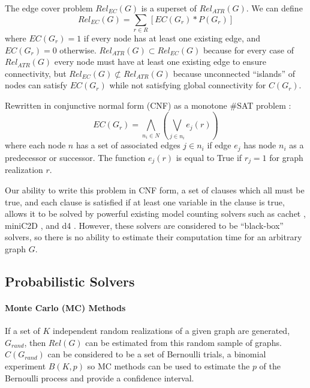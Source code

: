 \documentclass[12pt,twocolumn]{article}
\begin{document}
The edge cover problem \(Rel_{EC}(G)\) is a superset of \(Rel_{ATR}(G)\). We can define \[Rel_{EC}(G) = \sum_{r \in R} [EC(G_r)*P(G_r)]\] where \(EC(G_r)=1\) if every node has at least one existing edge, and \(EC(G_r)=0\) otherwise. \(Rel_{ATR}(G) \subset Rel_{EC}(G)\) because for every case of \(Rel_{ATR}(G)\) every node must have at least one existing edge to ensure connectivity, but \(Rel_{EC}(G) \not\subset Rel_{ATR}(G)\) because unconnected ``islands'' of nodes can satisfy \(EC(G_r)\) while not satisfying global connectivity for \(C(G_r)\).

Rewritten in conjunctive normal form (CNF) as a monotone \#SAT problem \cite{roth1996hardness} \cite{vaisman2015model}: \[EC(G_r) = \bigwedge_{n_i \in N} (\bigvee_{j \in n_i} e_j(r))\] where each node \(n\) has a set of associated edges \(j \in n_i\) if edge \(e_j\) has node \(n_i\) as a predecessor or successor. The function \(e_j(r)\) is equal to True if \(r_j=1\) for graph realization \(r\).

Our ability to write this problem in CNF form, a set of clauses which all must be true, and each clause is satisfied if at least one variable in the clause is true, allows it to be solved by powerful existing model counting solvers such as cachet \cite{sang2005heuristics}, miniC2D \cite{oztok2015top}, and d4 \cite{lagniez2017improved}. However, these solvers are considered to be ``black-box'' solvers, so there is no ability to estimate their computation time for an arbitrary graph \(G\).

\hypertarget{probabilistic-solvers}{%
\subsection{Probabilistic Solvers}\label{probabilistic-solvers}}

\hypertarget{monte-carlo-mc-methods}{%
\paragraph{\texorpdfstring{Monte Carlo (MC) Methods\\
}{Monte Carlo (MC) Methods }}\label{monte-carlo-mc-methods}}

If a set of \(K\) independent random realizations of a given graph are generated, \(G_{rand}\), then \(Rel(G)\) can be estimated from this random sample of graphs. \(C(G_{rand})\) can be considered to be a set of Bernoulli trials, a binomial experiment \(B(K,p)\) so MC methods can be used to estimate the \(p\) of the Bernoulli process and provide a confidence interval.
\end{document}
